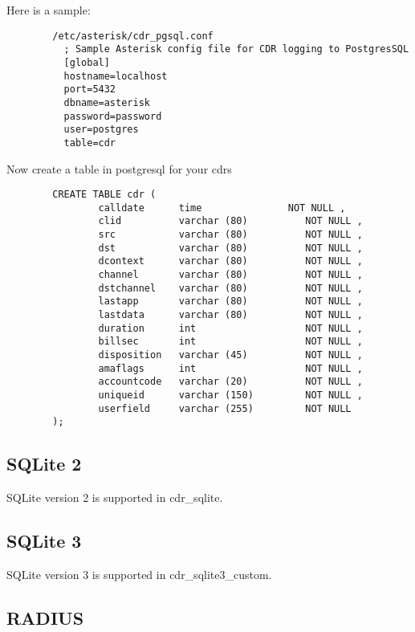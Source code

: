         Here is a sample:
\begin{astlisting}
\begin{verbatim}
        /etc/asterisk/cdr_pgsql.conf
          ; Sample Asterisk config file for CDR logging to PostgresSQL
          [global]
          hostname=localhost
          port=5432
          dbname=asterisk
          password=password
          user=postgres
          table=cdr
\end{verbatim}
\end{astlisting}
        Now create a table in postgresql for your cdrs
\begin{astlisting}
\begin{verbatim}
        CREATE TABLE cdr (
                calldate      time               NOT NULL ,
                clid          varchar (80)          NOT NULL ,
                src           varchar (80)          NOT NULL ,
                dst           varchar (80)          NOT NULL ,
                dcontext      varchar (80)          NOT NULL ,
                channel       varchar (80)          NOT NULL ,
                dstchannel    varchar (80)          NOT NULL ,
                lastapp       varchar (80)          NOT NULL ,
                lastdata      varchar (80)          NOT NULL ,
                duration      int                   NOT NULL ,
                billsec       int                   NOT NULL ,
                disposition   varchar (45)          NOT NULL ,
                amaflags      int                   NOT NULL ,
                accountcode   varchar (20)          NOT NULL ,
                uniqueid      varchar (150)         NOT NULL ,
                userfield     varchar (255)         NOT NULL
        );
\end{verbatim}
\end{astlisting}

\subsection{SQLite 2}

SQLite version 2 is supported in cdr\_sqlite.

\subsection{SQLite 3}

SQLite version 3 is supported in cdr\_sqlite3\_custom.

\subsection{RADIUS}


